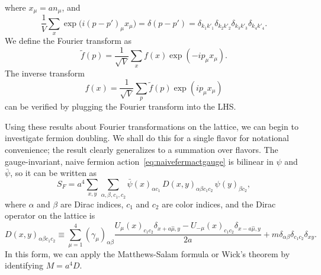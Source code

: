 where $x_\mu=an_\mu$, and
\begin{equation}
  \frac{1}{V}\sum_x\exp\big(i(p-p')_\mu x_\mu\big)
  =\delta(p-p')
  =\delta_{k_1k'_1}\delta_{k_2k'_2}\delta_{k_3k'_3}\delta_{k_4k'_4}.
\end{equation}
We define the Fourier transform as
\begin{equation}\label{eq:latft}
  \tilde{f}(p)=\frac{1}{\sqrt{V}}\sum_xf(x)\exp(-ip_\mu x_\mu).
\end{equation}
The inverse transform
\begin{equation}\label{eq:latift}
  f(x)=\frac{1}{\sqrt{V}}\sum_p\tilde{f}(p)\exp(ip_\mu x_\mu)
\end{equation}
can be verified by plugging the Fourier transform into the LHS.

Using these results about Fourier transformations on the lattice, we
can begin to investigate fermion doubling. We shall do this for
a single flavor for notational convenience; the result clearly
generalizes to a summation over flavors. 
The gauge-invariant, naive
fermion action~\eqref{eq:naivefermactgauge} is bilinear in $\psi$
and $\bar{\psi}$, so it can be written as
\begin{equation}
  S_F=a^4\sum_{x,y}\sum_{\alpha,\beta,c_1,c_2}\bar{\psi}(x)_{\alpha c_1}
      \,D(x,y)_{\alpha \beta c_1 c_2}\,\psi(y)_{\beta c_2},
\end{equation}
where $\alpha$ and $\beta$ are Dirac indices, $c_1$ and $c_2$ are
color indices, and the Dirac operator on the lattice is
\begin{equation}
  D(x,y)_{\alpha\beta c_1c_2}\equiv\sum_{\mu=1}^4(\gamma_\mu)_{\alpha\beta}
   \frac{U_\mu(x)_{c_1c_2}\delta_{x+a\hat{\mu},y}
         -U_{-\mu}(x)_{c_1c_2}\delta_{x-a\hat{\mu},y}}{2a}
   +m\delta_{\alpha\beta}\delta_{c_1c_2}\delta_{xy}.
\end{equation}
In this form, we can apply the Matthews-Salam formula or Wick's
theorem by identifying $M=a^4D$. 


